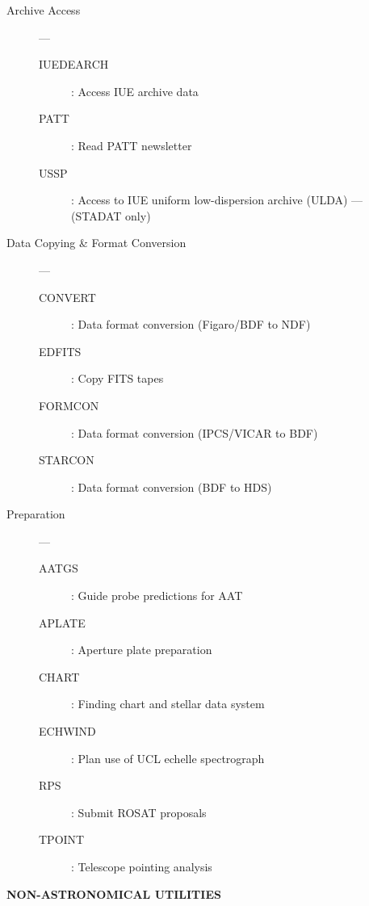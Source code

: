 \begin{description}

\item [Archive Access] ---
\begin{description}
\item [IUEDEARCH] : Access IUE archive data
\item [PATT] : Read PATT newsletter
\item [USSP] : Access to IUE uniform low-dispersion archive (ULDA) ---
 (STADAT only)
\end{description}

\item [Data Copying \& Format Conversion] ---
\begin{description}
\item [CONVERT] : Data format conversion (Figaro/BDF to NDF) 
\item [EDFITS] : Copy FITS tapes
\item [FORMCON] : Data format conversion (IPCS/VICAR to BDF)
\item [STARCON] : Data format conversion (BDF to HDS)
\end{description}

\item [Preparation] ---
\begin{description}
\item [AATGS] : Guide probe predictions for AAT
\item [APLATE] : Aperture plate preparation
\item [CHART] : Finding chart and stellar data system
\item [ECHWIND] : Plan use of UCL echelle spectrograph
\item [RPS] : Submit ROSAT proposals
\item [TPOINT] : Telescope pointing analysis
\end{description}

\end{description}

\begin{center}
{\bf\large NON-ASTRONOMICAL UTILITIES}
\end{center}


